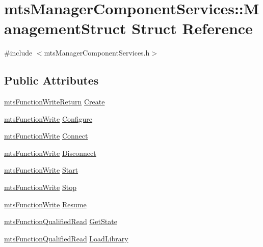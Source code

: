 \hypertarget{structmts_manager_component_services_1_1_management_struct}{\section{mts\-Manager\-Component\-Services\-:\-:Management\-Struct Struct Reference}
\label{structmts_manager_component_services_1_1_management_struct}
}


{\ttfamily \#include $<$mts\-Manager\-Component\-Services.\-h$>$}

\subsection*{Public Attributes}
\begin{DoxyCompactItemize}
\item 
\hyperlink{classmts_function_write_return}{mts\-Function\-Write\-Return} \hyperlink{structmts_manager_component_services_1_1_management_struct_ade9314ac542774096dc400785a895a9f}{Create}
\item 
\hyperlink{classmts_function_write}{mts\-Function\-Write} \hyperlink{structmts_manager_component_services_1_1_management_struct_aa68ade6cba2367681d59fb29073bdf46}{Configure}
\item 
\hyperlink{classmts_function_write}{mts\-Function\-Write} \hyperlink{structmts_manager_component_services_1_1_management_struct_a9050a3d86db6adcc5dfbb424812b9516}{Connect}
\item 
\hyperlink{classmts_function_write}{mts\-Function\-Write} \hyperlink{structmts_manager_component_services_1_1_management_struct_a1848eee4af8aac811da04d8ad34006e5}{Disconnect}
\item 
\hyperlink{classmts_function_write}{mts\-Function\-Write} \hyperlink{structmts_manager_component_services_1_1_management_struct_a12bb1e5a539b17a03dcf9ec0f631787d}{Start}
\item 
\hyperlink{classmts_function_write}{mts\-Function\-Write} \hyperlink{structmts_manager_component_services_1_1_management_struct_a7a57c05959bfe8bb619c8a6f0b68e537}{Stop}
\item 
\hyperlink{classmts_function_write}{mts\-Function\-Write} \hyperlink{structmts_manager_component_services_1_1_management_struct_aeebd24c9dacfe39ed7b7a7d04d96aa85}{Resume}
\item 
\hyperlink{classmts_function_qualified_read}{mts\-Function\-Qualified\-Read} \hyperlink{structmts_manager_component_services_1_1_management_struct_a0e0d7c3b16ab312d9830d39927972b35}{Get\-State}
\item 
\hyperlink{classmts_function_qualified_read}{mts\-Function\-Qualified\-Read} \hyperlink{structmts_manager_component_services_1_1_management_struct_a296914ee8e623509138f4b2a30148eeb}{Load\-Library}
\end{DoxyCompactItemize}


